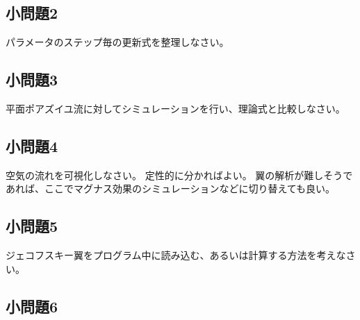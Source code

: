 \documentclass{article}
\begin{document}
\subsection{ 小問題2 }

パラメータのステップ毎の更新式を整理しなさい。

\subsection{ 小問題3 }

平面ポアズイユ流に対してシミュレーションを行い、理論式と比較しなさい。

\subsection{ 小問題4 }

空気の流れを可視化しなさい。
定性的に分かればよい。
翼の解析が難しそうであれば、ここでマグナス効果のシミュレーションなどに切り替えても良い。

\subsection{ 小問題5 }

ジェコフスキー翼をプログラム中に読み込む、あるいは計算する方法を考えなさい。

\subsection{ 小問題6 }
\end{document}
